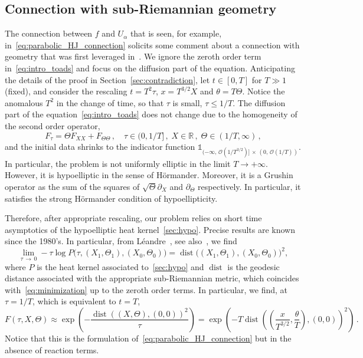 \documentclass[AHL,Unicode,longabstracts]{cedram}
\DeclareMathOperator{\dist}{dist}
\newcommand{\R}{\mathbb{R}}
\newcommand{\mO}{\mathcal{O}}
\newcommand{\1}{\mathds{1}}
\begin{document}
\subsection*{Connection with sub-Riemannian geometry}

The connection between $f$ and $U_\alpha$ that is seen, for example, in~\eqref{eq:parabolic_HJ_connection} solicits some comment about a connection with geometry that was first leveraged in~\cite{BouinChanHendersonKim}. We ignore the zeroth order term in~\eqref{eq:intro_toads} and focus on the diffusion part of the equation. Anticipating the details of the proof in Section~\ref{sec:contradiction}, let $t\in [0,T]$ for $T\gg1$ (fixed), and consider the rescaling $t = T^2\tau$, $x = T^{3/2} X $ and $\theta = T \Theta $. Notice the anomalous $T^2$ in the change of time, so that $\tau$ is small, $\tau\leq 1/T$. The diffusion part of the equation~\eqref{eq:intro_toads} does not change due to the homogeneity of the second order operator,
\begin{equation}\label{sec:hypo}
F_{\tau} = \Theta F_{XX} + F_{\Theta\Theta}\,,
\quad \tau\in (0,1/T]\,,
\;X\in \R \,,
\; \Theta\in (1/T,\infty) \,,
\end{equation}
and the initial data shrinks to the indicator function $\1_{(-\infty,\,\mO(1/T^{3/2})]\,\times\,(0,\,\mO(1/T))}$. In particular, the problem is not uniformly elliptic in the limit $T\to +\infty$. However, it is hypoelliptic in the sense of H\"ormander. Moreover, it is a Grushin operator as the sum of the squares of $\sqrt{\Theta} \partial_X$ and $\partial_\Theta$ respectively. In particular, it satisfies the strong H\"ormander condition of hypoellipticity.



Therefore, after appropriate rescaling, our problem relies on short time asymptotics of the hypoelliptic heat kernel~\eqref{sec:hypo}. Precise results are known since the 1980's. In particular, from Léandre~\cite{leandre_majoration_1987,leandre_minoration_1987}, see also~\cite{ben_arous_developpement_1988}, we find
\[
\lim_{\tau\,\to\,0} -\tau \log P\big(\tau,(X_1,\Theta_1),(X_0,\Theta_0)\big) = \dist\big((X_1,\Theta_1),(X_0,\Theta_0)\big)^2,
\]
where $P$ is the heat kernel associated to~\eqref{sec:hypo} and $\dist$ is the geodesic distance associated with the appropriate sub-Riemannian metric, which coincides with~\eqref{eq:minimization} up to the zeroth order terms. In particular, we find, at $\tau = 1/T$, which is equivalent to $t=T$,
\[
F(\tau,X, \Theta) \approx \exp\left(- \frac{\dist((X,\Theta), (0,0))^2}{\tau}\right) = \exp\left(- T \dist\left(\left(\frac{x}{T^{3/2}}, \frac{\theta}{T}\right), (0,0)\right)^2\right)\,.
\]
Notice that this is the formulation of~\eqref{eq:parabolic_HJ_connection} but in the absence of reaction terms.
\end{document}
